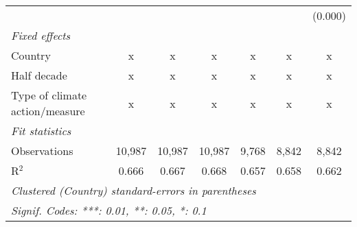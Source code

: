\begin{tabular}{lcccccc}
                                                      &         &               &                &                &                & (0.000)\\   
   \emph{Fixed effects}\\
   Country                                            & x       & x             & x              & x              & x              & x\\  
   Half decade                                        & x       & x             & x              & x              & x              & x\\  
   Type of climate action/measure                     & x       & x             & x              & x              & x              & x\\  
   \midrule \emph{Fit statistics}\\
   Observations                                       & 10,987  & 10,987        & 10,987         & 9,768          & 8,842          & 8,842\\  
   R$^2$                                              & 0.666   & 0.667         & 0.668          & 0.657          & 0.658          & 0.662\\  
   \midrule
   \multicolumn{7}{l}{\emph{Clustered (Country) standard-errors in parentheses}}\\
   \multicolumn{7}{l}{\emph{Signif. Codes: ***: 0.01, **: 0.05, *: 0.1}}\\
\end{tabular}
\par\endgroup


